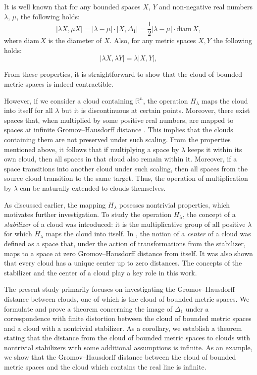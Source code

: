 \documentclass[leqno]{article}
\begin{document}
It is well known that for any bounded spaces $X$, $Y$ and non-negative real numbers $\lambda$, $\mu$, the following holds:  
$$
|\lambda X, \mu X| = |\lambda - \mu| \cdot |X, \Delta_1| = \frac{1}{2} |\lambda - \mu| \cdot \text{diam}\, X,
$$  
where $\text{diam}\, X$ is the diameter of $X$. Also, for any metric spaces $X,Y$ the following holds:
$$
|\lambda X, \lambda Y| = \lambda |X, Y|,
$$  
  
From these properties, it is straightforward to show that the cloud of bounded metric spaces is indeed contractible.  

However, if we consider a cloud containing $\mathbb{R}^n$, the operation $H_\lambda$ maps the cloud into itself for all $\lambda$ but it is discontinuous at certain points. Moreover, there exist spaces that, when multiplied by some positive real numbers, are mapped to spaces at infinite Gromov--Hausdorff distance \cite{TuzhBog1}. This implies that the clouds containing them are not preserved under such scaling.  
From the properties mentioned above, it follows that if multiplying a space by $\lambda$ keeps it within its own cloud, then all spaces in that cloud also remain within it. Moreover, if a space transitions into another cloud under such scaling, then all spaces from the source cloud transition to the same target. Thus, the operation of multiplication by $\lambda$ can be naturally extended to clouds themselves.  

As discussed earlier, the mapping $H_\lambda$ posesses nontrivial properties, which motivates further investigation. To study the operation $H_\lambda$, the concept of a \emph{stabilizer} of a cloud was introduced: it is the multiplicative group of all positive $\lambda$ for which $H_\lambda$ maps the cloud into itself. In \cite{TuzhBog2}, the notion of a \emph{center} of a cloud was defined as a space that, under the action of transformations from the stabilizer, maps to a space at zero Gromov--Hausdorff distance from itself. It was also shown that every cloud has a unique center up to zero distances. The concepts of the stabilizer and the center of a cloud play a key role in this work.  

The present study primarily focuses on investigating the Gromov--Hausdorff distance between clouds, one of which is the cloud of bounded metric spaces. We formulate and prove a theorem concerning the image of $\Delta_1$ under a correspondence with finite distortion between the cloud of bounded metric spaces and a cloud with a nontrivial stabilizer. As a corollary, we establish a theorem stating that the distance from the cloud of bounded metric spaces to clouds with nontrivial stabilizers with some additional assumptions is infinite. As an example, we show that the Gromov--Hausdorff distance between the cloud of bounded metric spaces and the cloud which contains the real line is infinite. 
\end{document}
